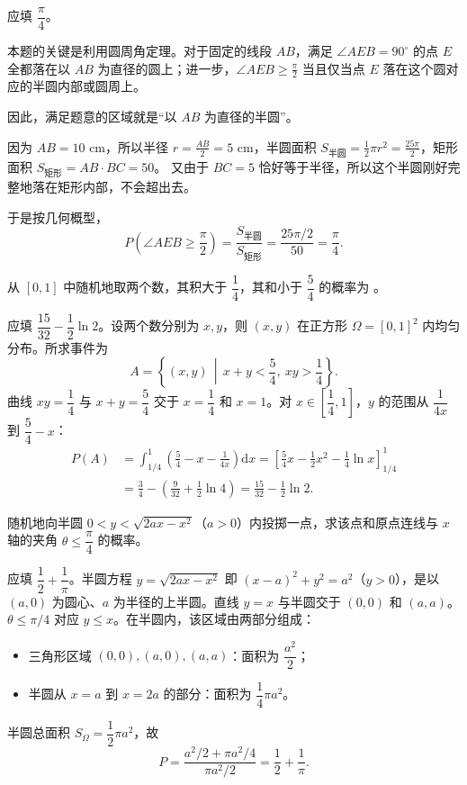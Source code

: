 ﻿\documentclass[lang=cn,11pt]{elegantbook}
\begin{document}
\begin{solution}
应填 \(\dfrac{\pi}{4}\)。

本题的关键是利用圆周角定理。对于固定的线段 \(AB\)，满足 \(\angle AEB=90^\circ\) 的点 \(E\) 全都落在以 \(AB\) 为直径的圆上；进一步，\(\angle AEB\ge \frac{\pi}{2}\) 当且仅当点 \(E\) 落在这个圆对应的半圆内部或圆周上。

因此，满足题意的区域就是“以 \(AB\) 为直径的半圆”。

因为 \(AB=10\text{ cm}\)，所以半径 \(r=\frac{AB}{2}=5\text{ cm}\)，半圆面积 \(S_{\text{半圆}}=\frac12\pi r^2=\frac{25\pi}{2}\)，矩形面积 \(S_{\text{矩形}}=AB\cdot BC=50\)。
又由于 \(BC=5\) 恰好等于半径，所以这个半圆刚好完整地落在矩形内部，不会超出去。

于是按几何概型，
\[
P\!\left(\angle AEB\ge \frac{\pi}{2}\right)
=\frac{S_{\text{半圆}}}{S_{\text{矩形}}}
=\frac{25\pi/2}{50}
=\frac{\pi}{4}.
\]
\end{solution}


\begin{exercise}\label{exer:1-37}
从 \([0,1]\) 中随机地取两个数，其积大于 \(\dfrac{1}{4}\)，其和小于 \(\dfrac{5}{4}\) 的概率为 \underline{\hspace{2cm}}。
\end{exercise}

\begin{solution}
应填 \(\dfrac{15}{32}-\dfrac{1}{2}\ln 2\)。设两个数分别为 \(x,y\)，则 \((x,y)\) 在正方形 \(\Omega=[0,1]^2\) 内均匀分布。所求事件为
\[A = \left\{(x,y)\,\middle|\, x+y<\frac{5}{4},\ xy>\frac{1}{4}\right\}.\]
曲线 \(xy=\dfrac{1}{4}\) 与 \(x+y=\dfrac{5}{4}\) 交于 \(x=\dfrac{1}{4}\) 和 \(x=1\)。对 \(x\in\left[\dfrac{1}{4},1\right]\)，\(y\) 的范围从 \(\dfrac{1}{4x}\) 到 \(\dfrac{5}{4}-x\)：
\begin{align*}
P(A) &= \int_{1/4}^{1}\left(\frac{5}{4}-x-\frac{1}{4x}\right)\mathrm{d}x = \left[\frac{5}{4}x-\frac{1}{2}x^2-\frac{1}{4}\ln x\right]_{1/4}^{1} \\
&= \frac{3}{4}-\left(\frac{9}{32}+\frac{1}{2}\ln 4\right) = \frac{15}{32}-\frac{1}{2}\ln 2.
\end{align*}
\end{solution}

\begin{exercise}\label{exer:1-38}
随机地向半圆 \(0<y<\sqrt{2ax-x^2}\)（\(a>0\)）内投掷一点，求该点和原点连线与 \(x\) 轴的夹角 \(\theta\le\dfrac{\pi}{4}\) 的概率。
\end{exercise}
\begin{solution}
应填 \(\dfrac{1}{2}+\dfrac{1}{\pi}\)。半圆方程 \(y=\sqrt{2ax-x^2}\) 即 \((x-a)^2+y^2=a^2\)（\(y>0\)），是以 \((a,0)\) 为圆心、\(a\) 为半径的上半圆。直线 \(y=x\) 与半圆交于 \((0,0)\) 和 \((a,a)\)。\(\theta\le\pi/4\) 对应 \(y\le x\)。在半圆内，该区域由两部分组成：
\begin{itemize}
    \item 三角形区域 \((0,0),(a,0),(a,a)\)：面积为 \(\dfrac{a^2}{2}\)；
    \item 半圆从 \(x=a\) 到 \(x=2a\) 的部分：面积为 \(\dfrac{1}{4}\pi a^2\)。
\end{itemize}
半圆总面积 \(S_\Omega=\dfrac{1}{2}\pi a^2\)，故
\[P = \frac{a^2/2+\pi a^2/4}{\pi a^2/2} = \frac{1}{2}+\frac{1}{\pi}.\]
\end{solution}
\end{document}
